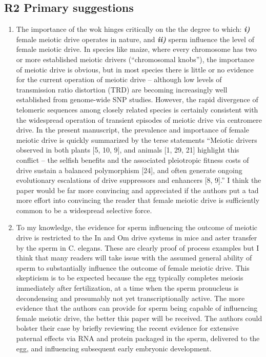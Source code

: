 \documentclass[12pt,letterpaper]{article}
\begin{document}
\subsection*{R2 Primary suggestions}
\begin{enumerate}
\item	The importance of the wok hinges critically on the the degree to which:  {\bf{\emph{i)}}}
female meiotic drive operates in nature, and {\bf{\emph{ii)}}} sperm influence the level of
female meiotic drive.  In species like maize, where every chromosome has two or
more established meiotic drivers (``chromosomal knobs''), the importance of
meiotic drive is obvious, but in most species there is little or no evidence for
the current operation of meiotic drive -- although low levels of transmission
ratio distortion (TRD) are becoming increasingly well established from
genome-wide SNP studies.  However, the rapid divergence of telomeric sequences
among closely related species is certainly consistent with the widespread
operation of transient episodes of meiotic drive via centromere drive.  In the
present manuscript, the prevalence and importance of female meiotic drive is
quickly summarized by the terse statements ``Meiotic drivers observed in both
plants [5, 10, 9], and animals [1, 29, 21] highlight this conflict -- the selfish
benefits and the associated pleiotropic fitness costs of drive sustain a
balanced polymorphism [24], and often generate ongoing evolutionary escalations
of drive suppressors and enhancers [8, 9].''  I think the paper would be far more
convincing and appreciated if the authors put a tad more effort into convincing
the reader that female meiotic drive is sufficiently common to be a widespread
selective force.

\item	 To my knowledge, the evidence for sperm influencing the outcome of meiotic
drive is restricted to the In and Om drive systems in mice and aster transfer by
the sperm in C. elegans.  These are clearly proof of process examples but I
think that many readers will take issue with the assumed general ability of
sperm to substantially influence the outcome of female meiotic drive. This
skepticism is to be expected  because the egg typically completes meiosis
immediately after fertilization, at a time when the sperm pronucleus is
decondensing and presumably not yet transcriptionally active. The more evidence
that the authors can provide for sperm being capable of influencing female
meiotic drive, the better this paper will be received. The authors could bolster
their case by briefly reviewing the recent evidence for extensive paternal
effects via RNA and protein packaged in the sperm, delivered to the egg, and
influencing subsequent early embryonic development. 


\end{enumerate}
\end{document}
